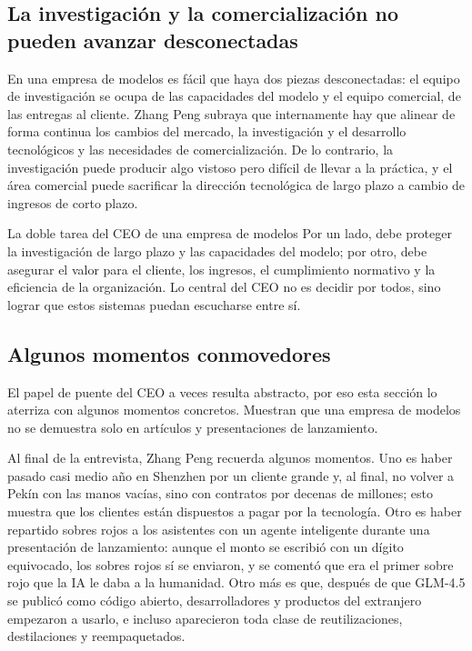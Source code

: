 \documentclass[a4paper]{article}
\begin{document}
\subsection{La investigación y la comercialización no pueden avanzar desconectadas}

En una empresa de modelos es fácil que haya dos piezas desconectadas: el equipo de investigación se ocupa de las capacidades del modelo y el equipo comercial, de las entregas al cliente. Zhang Peng subraya que internamente hay que alinear de forma continua los cambios del mercado, la investigación y el desarrollo tecnológicos y las necesidades de comercialización. De lo contrario, la investigación puede producir algo vistoso pero difícil de llevar a la práctica, y el área comercial puede sacrificar la dirección tecnológica de largo plazo a cambio de ingresos de corto plazo.

\begin{importantbox}{La doble tarea del CEO de una empresa de modelos}
Por un lado, debe proteger la investigación de largo plazo y las capacidades del modelo; por otro, debe asegurar el valor para el cliente, los ingresos, el cumplimiento normativo y la eficiencia de la organización. Lo central del CEO no es decidir por todos, sino lograr que estos sistemas puedan escucharse entre sí.
\end{importantbox}

\subsection{Algunos momentos conmovedores}

El papel de puente del CEO a veces resulta abstracto, por eso esta sección lo aterriza con algunos momentos concretos. Muestran que una empresa de modelos no se demuestra solo en artículos y presentaciones de lanzamiento.

Al final de la entrevista, Zhang Peng recuerda algunos momentos. Uno es haber pasado casi medio año en Shenzhen por un cliente grande y, al final, no volver a Pekín con las manos vacías, sino con contratos por decenas de millones; esto muestra que los clientes están dispuestos a pagar por la tecnología. Otro es haber repartido sobres rojos a los asistentes con un agente inteligente durante una presentación de lanzamiento: aunque el monto se escribió con un dígito equivocado, los sobres rojos sí se enviaron, y se comentó que era el primer sobre rojo que la IA le daba a la humanidad. Otro más es que, después de que GLM-4.5 se publicó como código abierto, desarrolladores y productos del extranjero empezaron a usarlo, e incluso aparecieron toda clase de reutilizaciones, destilaciones y reempaquetados.
\end{document}
